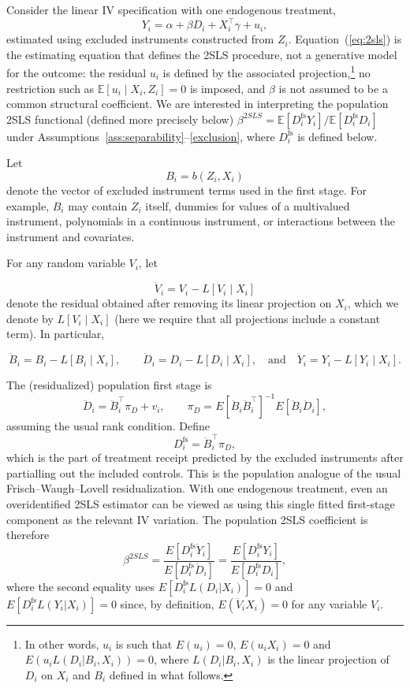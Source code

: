 \documentclass[11pt]{article}
\newcommand{\E}{\mathbb{E}}
\newcommand{\1}{\mathbf{1}}
\begin{document}
Consider the linear IV specification with one endogenous treatment,
\begin{equation}\label{eq:2sls}
Y_i = \alpha + \beta D_i + X_i^\top\gamma + u_i,    
\end{equation}
estimated using excluded instruments constructed from \(Z_i\). 
Equation~(\ref{eq:2sls}) is the estimating equation that defines the 2SLS
procedure, not a generative model for the outcome: the residual $u_i$ is defined by the
associated projection,\footnote{In other words, $u_i$ is such that $E(u_i)=0$, $E(u_i X_i)=0$ and $E(u_i L(D_i|B_i,X_i))=0$, where $L(D_i|B_i,X_i)$ is the linear projection of $D_i$ on $X_i$ and $B_i$ defined in what follows.} no restriction such as $\E[u_i\mid X_i,Z_i]=0$ is
imposed, and $\beta$ is not assumed to be a common structural coefficient.
We are interested in interpreting the  population 2SLS functional (defined more precisely below)
$\beta^{2SLS}=\E[D_i^{\mathrm{fs}}Y_i]/\E[D_i^{\mathrm{fs}}D_i]$ under
Assumptions~\ref{ass:separability}--\ref{exclusion}, where $D_i^{\mathrm{fs}}$ is defined below.

Let
\[
B_i=b(Z_i,X_i)
\]
denote the vector of excluded instrument terms used in the first stage. For example,
\(B_i\) may contain \(Z_i\) itself, dummies for values of a multivalued instrument,
polynomials in a continuous instrument, or interactions between the instrument and
covariates.

For any random variable \(V_i\), let

\[
\ddot V_i = V_i - L[V_i\mid X_i]
\]
denote the residual obtained after removing its linear projection on $X_i$, which we denote by $L[V_i\mid X_i]$ (here we require that all projections include a constant term).
In particular,

\[
\ddot B_i = B_i - L[B_i\mid X_i],
\qquad
\ddot D_i = D_i - L[D_i\mid X_i],
\quad \textrm{and} \quad
\ddot Y_i = Y_i - L[Y_i\mid X_i].
\]

The (residualized) population first stage is
\[
\ddot D_i = \ddot B_i^\top\pi_D + v_i,
\qquad
\pi_D
=
E[\ddot B_i\ddot B_i^\top]^{-1}E[\ddot B_i\ddot D_i],
\]
assuming the usual rank condition. Define
\[
D_i^{\mathrm{fs}}=\ddot B_i^\top \pi_D,
\]
which is the part of treatment receipt predicted by the excluded instruments after
partialling out the included controls. This is the population analogue of the usual
Frisch--Waugh--Lovell residualization.  With one endogenous treatment, even an
overidentified 2SLS estimator can be viewed as using this single fitted first-stage
component as the relevant IV variation. The population 2SLS coefficient is therefore
\[
\beta^{2SLS}
=
\frac{E[D_i^{\mathrm{fs}}\ddot Y_i]}
     {E[D_i^{\mathrm{fs}}\ddot D_i]}
=
\frac{E[D_i^{\mathrm{fs}}Y_i]}
     {E[D_i^{\mathrm{fs}}D_i]},
\]
where the second equality uses \(E[D_i^{\mathrm{fs}} L(D_i | X_i)]=0\) and \(E[D_i^{\mathrm{fs}} L(Y_i | X_i)]=0\) since, by definition, $E(\ddot V_i X_i)=0$ for any variable $V_i$.
\end{document}
